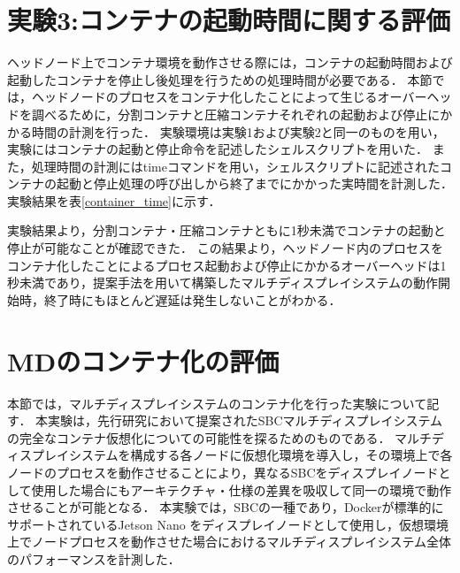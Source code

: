 \section{実験3:コンテナの起動時間に関する評価}
ヘッドノード上でコンテナ環境を動作させる際には，コンテナの起動時間および起動したコンテナを停止し後処理を行うための処理時間が必要である．
本節では，ヘッドノードのプロセスをコンテナ化したことによって生じるオーバーヘッドを調べるために，分割コンテナと圧縮コンテナそれぞれの起動および停止にかかる時間の計測を行った．
実験環境は実験1および実験2と同一のものを用い，実験にはコンテナの起動と停止命令を記述したシェルスクリプトを用いた．
また，処理時間の計測にはtimeコマンドを用い，シェルスクリプトに記述されたコンテナの起動と停止処理の呼び出しから終了までにかかった実時間を計測した．
実験結果を表\ref{container_time}に示す．

\begin{table}[H]
    \centering
    \caption{コンテナの起動と停止に要する時間}\label{tab1}
\end{table}

実験結果より，分割コンテナ・圧縮コンテナともに1秒未満でコンテナの起動と停止が可能なことが確認できた．
この結果より，ヘッドノード内のプロセスをコンテナ化したことによるプロセス起動および停止にかかるオーバーヘッドは1秒未満であり，提案手法を用いて構築したマルチディスプレイシステムの動作開始時，終了時にもほとんど遅延は発生しないことがわかる．

\section{MDのコンテナ化の評価}
本節では，マルチディスプレイシステムのコンテナ化を行った実験について記す．
本実験は，先行研究において提案されたSBCマルチディスプレイシステムの完全なコンテナ仮想化についての可能性を探るためのものである．
マルチディスプレイシステムを構成する各ノードに仮想化環境を導入し，その環境上で各ノードのプロセスを動作させることにより，異なるSBCをディスプレイノードとして使用した場合にもアーキテクチャ・仕様の差異を吸収して同一の環境で動作させることが可能となる．
本実験では，SBCの一種であり，Dockerが標準的にサポートされているJetson Nano \cite{jetson}をディスプレイノードとして使用し，仮想環境上でノードプロセスを動作させた場合におけるマルチディスプレイシステム全体のパフォーマンスを計測した．

